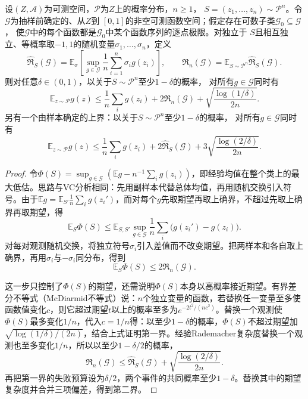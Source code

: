 \begin{theorem}[Rademacher复杂度给出的期望风险上界]
\label{thm:rademacher-risk-bound}
设$(Z,\mathcal A)$为可测空间，$\mathcal P$为$Z$上的概率分布，$n\geq1$，
$S=(z_1,\ldots,z_n)\sim\mathcal P^n$。令$\mathcal G$为抽样前确定的、从$Z$到
$[0,1]$的非空可测函数空间；假定存在可数子类$\mathcal G_0\subseteq\mathcal G$，
使$\mathcal G$中的每个函数都是$\mathcal G_0$中某个函数序列的逐点极限。对独立于
$S$且相互独立、等概率取$-1,1$的随机变量$\sigma_1,\ldots,\sigma_n$，定义
\[
 \widehat{\mathfrak R}_S(\mathcal G)
 =\mathbb E_\sigma\left[\sup_{g\in\mathcal G}
   \frac1n\sum_{i=1}^n\sigma_i g(z_i)\right],\qquad
 \mathfrak R_n(\mathcal G)
 =\mathbb E_{S\sim\mathcal P^n}\widehat{\mathfrak R}_S(\mathcal G).
\]
则对任意$\delta\in(0,1)$，以关于$S\sim\mathcal P^n$至少$1-\delta$的概率，
对所有$g\in\mathcal G$同时有
\begin{equation}
 \mathbb E_{z\sim\mathcal P}g(z)
 \leq\frac1n\sum_i g(z_i)+2\mathfrak R_n(\mathcal G)
 +\sqrt{\frac{\log(1/\delta)}{2n}}.
 \label{eq:rademacher-risk-bound}
\end{equation}
另有一个由样本确定的上界：以关于$S\sim\mathcal P^n$至少$1-\delta$的概率，
对所有$g\in\mathcal G$同时有
\begin{equation}
 \mathbb E_{z\sim\mathcal P}g(z)
 \leq\frac1n\sum_i g(z_i)+2\widehat{\mathfrak R}_S(\mathcal G)
 +3\sqrt{\frac{\log(2/\delta)}{2n}}.
 \label{eq:empirical-rademacher-risk-bound}
\end{equation}
\end{theorem}

\begin{proof}
令$\Phi(S)=\sup_{g\in\mathcal G}(\mathbb E g-n^{-1}\sum_i g(z_i))$，即经验均值在整个类上的最大低估。思路与VC分析相同：先用副样本代替总体均值，再用随机交换引入符号。由于$\mathbb E g=\mathbb E_{S'}\frac1n\sum_ig(z_i')$，而对每个$g$先取期望再取上确界，不超过先取上确界再取期望，得
\[
 \mathbb E_S\Phi(S)
 \leq\mathbb E_{S,S'}\sup_{g\in\mathcal G}
 \frac1n\sum_i\bigl(g(z_i')-g(z_i)\bigr).
\]
对每对观测随机交换，将独立符号$\sigma_i$引入差值而不改变期望。把两样本和各自取上确界，再用$\sigma_i$与$-\sigma_i$同分布，得到
\begin{equation}
 \mathbb E_S\Phi(S)\leq2\mathfrak R_n(\mathcal G).
 \label{eq:rademacher-symmetrization}
\end{equation}

这一步只控制了$\Phi(S)$的期望，还需说明$\Phi(S)$本身以高概率接近期望。有界差分不等式（McDiarmid不等式）说：$n$个独立变量的函数，若替换任一变量至多使函数值变化$c$，则它超过期望$t$以上的概率至多为$e^{-2t^2/(nc^2)}$。替换一个观测使$\Phi(S)$最多变化$1/n$，代入$c=1/n$得：以至少$1-\delta$的概率，$\Phi(S)$不超过期望加$\sqrt{\log(1/\delta)/(2n)}$，结合上式证明第一界。经验Rademacher复杂度替换一个观测也至多变化$1/n$，所以以至少$1-\delta/2$的概率，
\[
 \mathfrak R_n(\mathcal G)
 \leq\widehat{\mathfrak R}_S(\mathcal G)
 +\sqrt{\frac{\log(2/\delta)}{2n}}.
\]
再把第一界的失败预算设为$\delta/2$，两个事件的共同概率至少$1-\delta$。替换其中的期望复杂度并合并三项偏差，得到第二界。
\end{proof}

